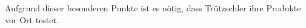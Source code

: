     Aufgrund dieser besonderen Punkte ist es nötig, dass Trützschler ihre Produkte vor Ort testet.



        



